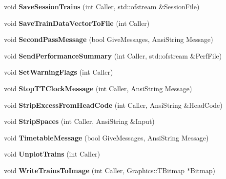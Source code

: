\begin{DoxyCompactItemize}
void {\bfseries Save\+Session\+Trains} (int Caller, std\+::ofstream \&Session\+File)
\item 
\mbox{\label{class_t_train_controller_a6161618bda2a677f797eda9a9deeb9fa}} 
void {\bfseries Save\+Train\+Data\+Vector\+To\+File} (int Caller)
\item 
\mbox{\label{class_t_train_controller_a8df4599a1ae95093241fb707711af894}} 
void {\bfseries Second\+Pass\+Message} (bool Give\+Messages, Ansi\+String Message)
\item 
\mbox{\label{class_t_train_controller_af6c6e1e1236559f07b29b069d4377690}} 
void {\bfseries Send\+Performance\+Summary} (int Caller, std\+::ofstream \&Perf\+File)
\item 
\mbox{\label{class_t_train_controller_a29c49509e56368954ca3334a37648a7a}} 
void {\bfseries Set\+Warning\+Flags} (int Caller)
\item 
\mbox{\label{class_t_train_controller_aba5615209a7dca921e968fca5c52c060}} 
void {\bfseries Stop\+T\+T\+Clock\+Message} (int Caller, Ansi\+String Message)
\item 
\mbox{\label{class_t_train_controller_ac47f05f3d0baaf235c430b631c6fd1ad}} 
void {\bfseries Strip\+Excess\+From\+Head\+Code} (int Caller, Ansi\+String \&Head\+Code)
\item 
\mbox{\label{class_t_train_controller_ab0481dd8db0f3f99811f2cdc5b5dfd32}} 
void {\bfseries Strip\+Spaces} (int Caller, Ansi\+String \&Input)
\item 
\mbox{\label{class_t_train_controller_a68d2124bc8f7df43e973299e0afb3dcd}} 
void {\bfseries Timetable\+Message} (bool Give\+Messages, Ansi\+String Message)
\item 
\mbox{\label{class_t_train_controller_a7e2abfcc38e51933883d959c4155aca0}} 
void {\bfseries Unplot\+Trains} (int Caller)
\item 
\mbox{\label{class_t_train_controller_aa5e441a9ec80e5076b2c05c2bb6f3fd3}} 
void {\bfseries Write\+Trains\+To\+Image} (int Caller, Graphics\+::\+T\+Bitmap $\ast$Bitmap)
\end{DoxyCompactItemize}
